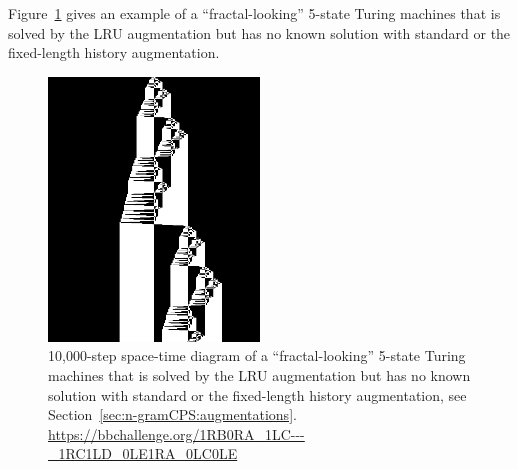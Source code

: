 Figure~\ref{fig:ngram-cps-more} gives an example of a ``fractal-looking'' 5-state Turing machines that is solved by the LRU augmentation but has no known solution with standard \ngramcps or the fixed-length history augmentation.

\begin{figure}
    \centering
    \includegraphics[width=0.5\textwidth]{figures/space-time-diagrams/ngramcps_LRU_35409542.png}

    \caption{10,000-step space-time diagram of a ``fractal-looking'' 5-state Turing machines that is solved by the LRU augmentation but has no known solution with standard \ngramcps or the fixed-length history augmentation, see Section~\ref{sec:n-gramCPS:augmentations}. \url{https://bbchallenge.org/1RB0RA_1LC---_1RC1LD_0LE1RA_0LC0LE}}\label{fig:ngram-cps-more}
\end{figure}




\newcommand{\leftngram}{left\xspace}
\newcommand{\rightngram}{right\xspace}
\newcommand{\middlesymbol}{middle\xspace}

